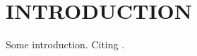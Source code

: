 \chapter{INTRODUCTION}
\label{chapter:introduction}

Some introduction. Citing \cite{exampleCitation}.